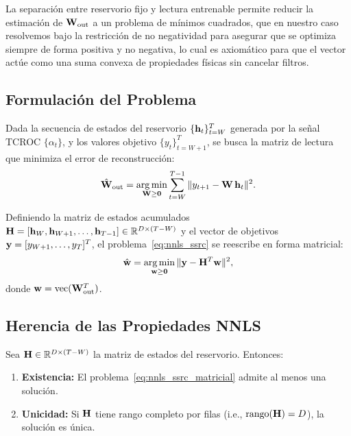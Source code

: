 La separación entre reservorio fijo y lectura entrenable permite
reducir la estimación de $\mathbf{W}_{\text{out}}$ a un problema de
mínimos cuadrados, que en nuestro caso resolvemos bajo la restricción de no negatividad para asegurar que se optimiza siempre de forma positiva y no negativa, lo cual es axiomático para que el vector actúe como una suma convexa de propiedades físicas sin cancelar filtros.

\subsection{Formulación del Problema}
\label{subsec:formulacion_nnls_ssrc}

Dada la secuencia de estados del reservorio
$\{\mathbf{h}_t\}_{t=W}^{T}$ generada por la señal TCROC
$\{\alpha_t\}$, y los valores objetivo
$\{y_t\}_{t=W+1}^{T}$, se busca la matriz de lectura que
minimiza el error de reconstrucción:
\begin{equation}
    \hat{\mathbf{W}}_{\text{out}} = \operatorname*{arg\,min}_{\mathbf{W} \ge \mathbf{0}}
    \sum_{t=W}^{T-1}
    \|y_{t+1} - \mathbf{W}\,\mathbf{h}_t\|^2.
    \label{eq:nnls_ssrc}
\end{equation}

Definiendo la matriz de estados acumulados
$\mathbf{H} = [\mathbf{h}_W, \mathbf{h}_{W+1}, \ldots,
\mathbf{h}_{T-1}] \in \mathbb{R}^{D \times (T-W)}$ y el vector
de objetivos $\mathbf{y} = [y_{W+1}, \ldots, y_T]^T$, el
problema~\eqref{eq:nnls_ssrc} se reescribe en forma matricial:
\begin{equation}
    \hat{\mathbf{w}} = \operatorname*{arg\,min}_{\mathbf{w} \ge \mathbf{0}}
    \|\mathbf{y} - \mathbf{H}^T\mathbf{w}\|^2,
    \label{eq:nnls_ssrc_matricial}
\end{equation}
donde $\mathbf{w} = \text{vec}(\mathbf{W}_{\text{out}}^T)$.

\subsection{Herencia de las Propiedades NNLS}
\label{subsec:herencia_nnls}

\begin{theorem}
\label{teo:existencia_wout}
Sea $\mathbf{H} \in \mathbb{R}^{D \times (T-W)}$ la matriz de estados
del reservorio.  Entonces:
\begin{enumerate}
    \item \textbf{Existencia:} El
    problema~\eqref{eq:nnls_ssrc_matricial} admite al menos una
    solución.
    \item \textbf{Unicidad:} Si $\mathbf{H}$ tiene rango completo por
    filas (i.e., $\mathrm{rango}(\mathbf{H}) = D$), la solución es
    única.
\end{enumerate}
\end{theorem}


